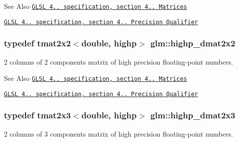 \begin{DoxySeeAlso}{See Also}
\href{http://www.opengl.org/registry/doc/GLSLangSpec.4.20.8.pdf}{\tt G\-L\-S\-L 4.. specification, section 4.. Matrices} 

\href{http://www.opengl.org/registry/doc/GLSLangSpec.4.20.8.pdf}{\tt G\-L\-S\-L 4.. specification, section 4.. Precision Qualifier} 
\end{DoxySeeAlso}
\hypertarget{group__core__precision_gaf0445ee32625d26bf79bb84e3d5a5502}{
\subsubsection[{highp\-\_\-dmat2x2}]{\setlength{\rightskip}{0pt plus 5cm}typedef tmat2x2$<$double, highp$>$ {\bf glm\-::highp\-\_\-dmat2x2}}}\label{group__core__precision_gaf0445ee32625d26bf79bb84e3d5a5502}
2 columns of 2 components matrix of high precision floating-\/point numbers.

\begin{DoxySeeAlso}{See Also}
\href{http://www.opengl.org/registry/doc/GLSLangSpec.4.20.8.pdf}{\tt G\-L\-S\-L 4.. specification, section 4.. Matrices} 

\href{http://www.opengl.org/registry/doc/GLSLangSpec.4.20.8.pdf}{\tt G\-L\-S\-L 4.. specification, section 4.. Precision Qualifier} 
\end{DoxySeeAlso}
\hypertarget{group__core__precision_ga29884defff6f7109b1e99ef8a6ce7e0a}{
\subsubsection[{highp\-\_\-dmat2x3}]{\setlength{\rightskip}{0pt plus 5cm}typedef tmat2x3$<$double, highp$>$ {\bf glm\-::highp\-\_\-dmat2x3}}}\label{group__core__precision_ga29884defff6f7109b1e99ef8a6ce7e0a}
2 columns of 3 components matrix of high precision floating-\/point numbers.

